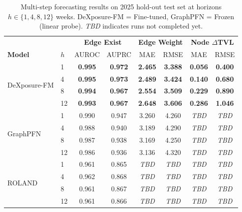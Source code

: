 \begin{table}[t]
\centering
\small
\setlength{\tabcolsep}{4pt}
\begin{tabular}{llcccccc}
\hline
& & \multicolumn{2}{c}{\textbf{Edge Exist}} & \multicolumn{2}{c}{\textbf{Edge Weight}} & \multicolumn{2}{c}{\textbf{Node $\Delta$TVL}} \\
\textbf{Model} & $h$ & AUROC & AUPRC & MAE & RMSE & MAE & RMSE \\
\hline
\multirow{4}{*}{DeXposure-FM}
& 1 & \textbf{0.995} & \textbf{0.972} & \textbf{2.465} & \textbf{3.388} & \textbf{0.056} & \textbf{0.400} \\
& 4 & \textbf{0.995} & \textbf{0.973} & \textbf{2.489} & \textbf{3.424} & \textbf{0.140} & \textbf{0.680} \\
& 8 & \textbf{0.994} & \textbf{0.967} & \textbf{2.554} & \textbf{3.509} & \textbf{0.229} & \textbf{0.890} \\
& 12 & \textbf{0.993} & \textbf{0.967} & \textbf{2.648} & \textbf{3.606} & \textbf{0.286} & \textbf{1.046} \\
\hline
\multirow{4}{*}{GraphPFN}
& 1 & 0.990 & 0.947 & 3.260 & 4.260 & \textit{TBD} & \textit{TBD} \\
& 4 & 0.988 & 0.940 & 3.189 & 4.290 & \textit{TBD} & \textit{TBD} \\
& 8 & 0.987 & 0.938 & 3.169 & 4.250 & \textit{TBD} & \textit{TBD} \\
& 12 & 0.986 & 0.936 & 3.136 & 4.320 & \textit{TBD} & \textit{TBD} \\
\hline
\multirow{4}{*}{ROLAND}
& 1 & 0.961 & 0.865 & \textit{TBD} & \textit{TBD} & \textit{TBD} & \textit{TBD} \\
& 4 & 0.962 & 0.868 & \textit{TBD} & \textit{TBD} & \textit{TBD} & \textit{TBD} \\
& 8 & 0.961 & 0.867 & \textit{TBD} & \textit{TBD} & \textit{TBD} & \textit{TBD} \\
& 12 & 0.961 & 0.866 & \textit{TBD} & \textit{TBD} & \textit{TBD} & \textit{TBD} \\
\hline
\end{tabular}
\caption{Multi-step forecasting results on 2025 hold-out test set at horizons $h \in \{1,4,8,12\}$ weeks. DeXposure-FM = Fine-tuned, GraphPFN = Frozen (linear probe). \textit{TBD} indicates runs not completed yet.}
\label{tab:main-results}
\end{table}

